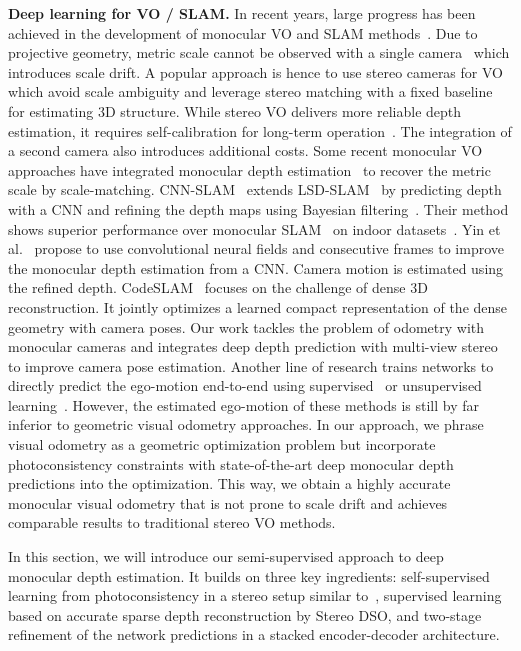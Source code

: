 \documentclass[runningheads]{llncs}
\begin{document}
\textbf{Deep learning for VO / SLAM.} 
In recent years, large progress has been achieved in the development of monocular VO and SLAM methods~\cite{mur2017orb,engel2014lsd,engel2017direct,newcombe2011dtam}.
Due to projective geometry, metric scale cannot be observed with a single camera~\cite{strasdat2010scale} which introduces scale drift. 
A popular approach is hence to use stereo cameras for VO~\cite{engel2015large,engel2017direct,mur2017orb} which avoid scale ambiguity and leverage stereo matching with a fixed baseline for estimating 3D structure. 
While stereo VO delivers more reliable depth estimation, it requires self-calibration for long-term operation~\cite{dang2009continuous,yin2017scale}. The integration of a second camera also introduces additional costs.
Some recent monocular VO approaches have integrated monocular depth estimation~\cite{yin2017scale,tateno2017cnn} to recover the metric scale by scale-matching.
CNN-SLAM~\cite{tateno2017cnn} extends LSD-SLAM~\cite{engel2014lsd} by predicting depth with a CNN and refining the depth maps using Bayesian filtering~\cite{engel2014lsd,engel2013iccv}. 
Their method shows superior performance over monocular 
SLAM~\cite{engel2014lsd,mur2015orb,yang2018challenges,pizzoli2014remode} on 
indoor datasets~\cite{handa2014benchmark,sturm2012benchmark}. Yin et 
al.~\cite{yin2017scale} propose to use convolutional neural fields and 
consecutive frames to improve the monocular depth estimation from a CNN. 
Camera motion is estimated using the refined depth. 
CodeSLAM~\cite{bloesch2018codeslam} focuses on the challenge of dense 3D reconstruction. 
It jointly optimizes a learned compact representation of the dense geometry with camera poses. 
Our work tackles the problem of odometry with monocular cameras and integrates deep depth prediction with multi-view stereo to improve camera pose estimation.
Another line of research trains networks to directly predict the ego-motion end-to-end using supervised~\cite{wang2017deepvo} or unsupervised learning~\cite{zhou2017unsupervised,li2017undeepvo}.
However, the estimated ego-motion of these methods is still by far inferior to geometric visual odometry approaches.
In our approach, we phrase visual odometry as a geometric optimization problem but incorporate photoconsistency constraints with state-of-the-art deep monocular depth predictions into the optimization.
This way, we obtain a highly accurate monocular visual odometry that is not prone to scale drift and achieves comparable results to traditional stereo VO methods.


In this section, we will introduce our semi-supervised approach to deep monocular depth estimation.
It builds on three key ingredients: self-supervised learning from photoconsistency in a stereo setup similar to~\cite{godard2016unsupervised},
supervised learning based on accurate sparse depth reconstruction by Stereo DSO, and two-stage refinement of the network predictions in a stacked encoder-decoder architecture. 
\end{document}
